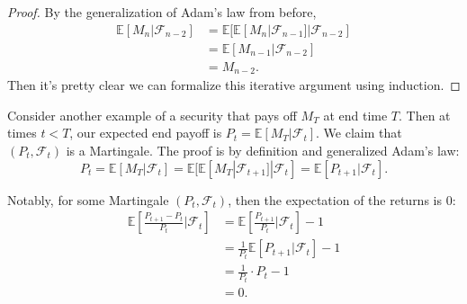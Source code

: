 
\begin{proof}
	By the generalization of Adam's law from before, \begin{align*}
		\mathbb E[M_n|\mathcal F_{n-2}] &= \mathbb E[\mathbb E[M_n|\mathcal F_{n-1}]|\mathcal F_{n-2}] \\
										&= \mathbb E[M_{n-1}|\mathcal F_{n-2}] \\
										&= M_{n-2}.
	\end{align*} Then it's pretty clear we can formalize this iterative argument using induction.
\end{proof} 

Consider another example of a security that pays off $M_T$ at end time $T$. Then at times $t<T$, our expected end payoff is $P_t=\mathbb E[M_T|\mathcal F_t]$. We claim that $(P_t,\mathcal F_t)$ is a Martingale. The proof is by definition and generalized Adam's law: $$ P_t = \mathbb E[M_T|\mathcal F_t] = \mathbb E[\mathbb E[M_T|\mathcal F_{t+1}]|\mathcal F_t] = \mathbb E[P_{t+1}|\mathcal F_t]. $$ 

Notably, for some Martingale $(P_t,\mathcal F_t)$, then the expectation of the returns is 0: \begin{align*}
\mathbb E \left[ \frac{P_{t+1}-P_t}{P_t}\bigg\rvert\mathcal F_t \right]  &= \mathbb E \left[ \frac{P_{t+1}}{P_t}\bigg\rvert\mathcal F_t \right] - 1 \\
																		 &= \frac{1}{P_t}\mathbb E[P_{t+1}|\mathcal F_t] - 1 \\
																		 &= \frac{1}{P_t}\cdot P_t - 1 \\
																		 &= 0.
\end{align*} 

